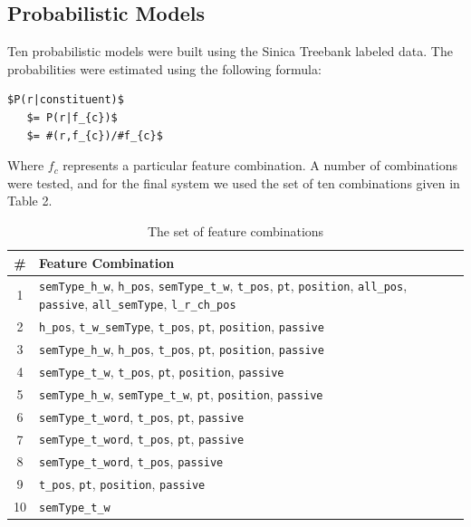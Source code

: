 \documentclass[11pt]{article}
\begin{document}
\subsection{Probabilistic Models}
Ten probabilistic models were built using the Sinica Treebank labeled data. The probabilities were estimated using the following formula:
\begin{Verbatim}[commandchars=\\\{\},codes={\catcode`$=3\catcode`_=8}]
  $P(r|constituent)$  
   $= P(r|f_{c})$
   $= #(r,f_{c})/#f_{c}$
\end{Verbatim} 
Where $f_c$ represents a particular feature combination. A number of combinations were tested, and for the final system we used the set of ten combinations given in Table 2.
\begin{table}[!h]
\small
\begin{center}
\begin{tabular}{|c|p{6cm}|}
\hline \textbf{\#} & \textbf{Feature Combination} \\ 
\hline 1 & \verb+semType_h_w+, \verb+h_pos+, \verb+semType_t_w+, \verb+t_pos+, \verb+pt+, \verb+position+, \verb+all_pos+, \verb+passive+, \verb+all_semType+, \verb+l_r_ch_pos+ \\ 
 2 & \verb+h_pos+, \verb+t_w_semType+, \verb+t_pos+, \verb+pt+, \verb+position+, \verb+passive+\\ 
 3 & \verb+semType_h_w+, \verb+h_pos+, \verb+t_pos+, \verb+pt+, \verb+position+, \verb+passive+\\  
 4 &  \verb+semType_t_w+, \verb+t_pos+, \verb+pt+, \verb+position+, \verb+passive+\\   
 5 &  \verb+semType_h_w+, \verb+semType_t_w+, \verb+pt+, \verb+position+, \verb+passive+\\ 
 6 &  \verb+semType_t_word+, \verb+t_pos+, \verb+pt+, \verb+passive+\\ 
 7 &  \verb+semType_t_word+, \verb+t_pos+, \verb+pt+, \verb+passive+ \\ 
 8 &  \verb+semType_t_word+, \verb+t_pos+, \verb+passive+ \\ 
 9 & \verb+t_pos+, \verb+pt+, \verb+position+, \verb+passive+ \\ 
 10  & \verb+semType_t_w+ \\ 
\hline 
\end{tabular} %
\caption{The set of feature combinations}
\normalsize
\end{center}
\end{table}
\end{document}
